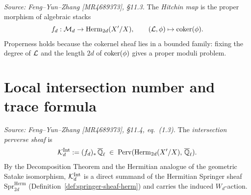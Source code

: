 \begin{definition}
  \label{def:hitchin-map}
  \textit{Source: Feng--Yun--Zhang [MR4689373], \S11.3.}
  The \emph{Hitchin map} is the proper morphism of algebraic stacks
  \[
    f_d : \mathcal{M}_d \to \operatorname{Herm}_{2d}(X'/X),
    \qquad (\mathcal{L}, \phi) \mapsto \operatorname{coker}(\phi).
  \]
  Properness holds because the cokernel sheaf lies in a bounded family: fixing the
  degree of \(\mathcal{L}\) and the length \(2d\) of \(\operatorname{coker}(\phi)\) gives a proper moduli
  problem.
\end{definition}

\section{Local intersection number and trace formula}

\begin{definition}
  \label{def:K-Int}
  \textit{Source: Feng--Yun--Zhang [MR4689373], \S11.4, eq.~(1.3).}
  The \emph{intersection perverse sheaf} is
  \[
    \mathcal{K}_d^{\mathrm{Int}} := (f_d)_*\, \overline{\mathbb{Q}}_\ell
    \;\in\; \mathrm{Perv}(\operatorname{Herm}_{2d}(X'/X),\, \overline{\mathbb{Q}}_\ell).
  \]
  By the Decomposition Theorem and the Hermitian analogue of the geometric Satake
  isomorphism, \(\mathcal{K}_d^{\mathrm{Int}}\) is a direct summand of the Hermitian
  Springer sheaf \(\mathrm{Spr}^{\mathrm{Herm}}_{2d}\)
  (Definition~\ref{def:springer-sheaf-herm}) and carries the induced \(W_d\)-action.
\end{definition}

